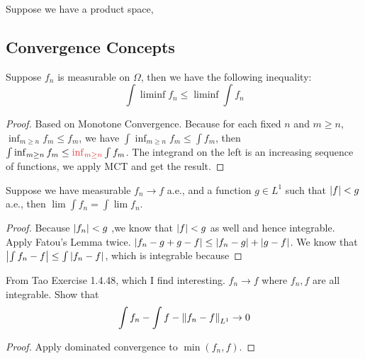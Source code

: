 \begin{thm}
    Suppose we have a product space, 
\end{thm}

\subsection{Convergence Concepts}


\begin{thm}
    Suppose \(f_{n}\) is measurable on \(\Omega\), then we have the following inequality:
    \begin{equation*}
        \int \liminf f_{n}\leq \liminf \int f_{n} 
    \end{equation*}
\end{thm}
\begin{proof}
    Based on Monotone Convergence. Because for each fixed \(n\) and \(m \geq n\), \(\inf_{m\geq n} f_{m} \leq f_{m}\), we have \(\int \inf_{m\geq n} f_{m} \leq \int f_{m}\), then \(\int \inf_{m\geq n} f_{m} \leq \red{\inf_{m \geq n}}\int f_{m}\). The integrand on the left is an increasing sequence of functions, we apply MCT and get the result. 
\end{proof}

\begin{thm}
    Suppose we have measurable \(f_{n} \to f\) a.e., and a function \(g \in L^{1}\) such that \(\abs{f} < g\) a.e., then \(\lim \int f_{n} = \int \lim f_{n}\). 
\end{thm}

\begin{proof}
    Because \(\abs{f_{n}} < g\) ,we know that \(\abs{f} < g\) as well and hence integrable.
    Apply Fatou's Lemma twice. \(\abs{f_{n} - g + g - f} \leq \abs{f_{n} - g} + \abs{g - f}\). 
    We know that \(\abs{\int f_{n} - f} \leq \int \abs{f_{n} - f} \), which is integrable because  
\end{proof}

\begin{proposition}
    From Tao Exercise 1.4.48, which I find interesting. \(f_{n} \to f\) where \(f_{n}, f\) are all integrable. Show that 
    \begin{equation*}
        \int f_{n} - \int f - \norm{f_{n} - f}_{L^{1}} \to 0
    \end{equation*}
\end{proposition}
\begin{proof}
    Apply dominated convergence to \(\min(f_{n}, f)\).
\end{proof}

